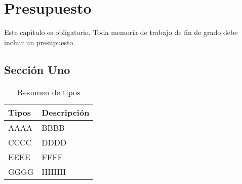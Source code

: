 \chapter{Presupuesto}
\label{ch:presupuesto}

\noindent Este capítulo es obligatorio. Toda memoria de trabajo de fin de grado debe incluir un presupuesto.

\section{Sección Uno}

\begin{table}[htb]
    \begin{center}
        \begin{tabularx}{0.8\textwidth} { X X }
            \toprule
            \textbf{Tipos} & \textbf{Descripción} \\
            \midrule
            AAAA  & BBBB \\
            CCCC  & DDDD \\
            EEEE  & FFFF \\
            GGGG  & HHHH \\
            \bottomrule
        \end{tabularx}
    \end{center}
    \caption{Resumen de tipos}
    \label{tbl:presupuesto}
\end{table}